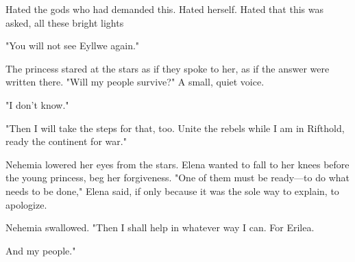 Hated the gods who had demanded this. Hated herself. Hated that this was asked, all these bright lights 

"You will not see Eyllwe again."

The princess stared at the stars as if they spoke to her, as if the answer were written there. "Will my people survive?" A small, quiet voice.

"I don't know."

"Then I will take the steps for that, too. Unite the rebels while I am in Rifthold, ready the continent for war."

Nehemia lowered her eyes from the stars. Elena wanted to fall to her knees before the young princess, beg her forgiveness. "One of them must be ready---to do what needs to be done," Elena said, if only because it was the sole way to explain, to apologize.

Nehemia swallowed. "Then I shall help in whatever way I can. For Erilea.

And my people."
